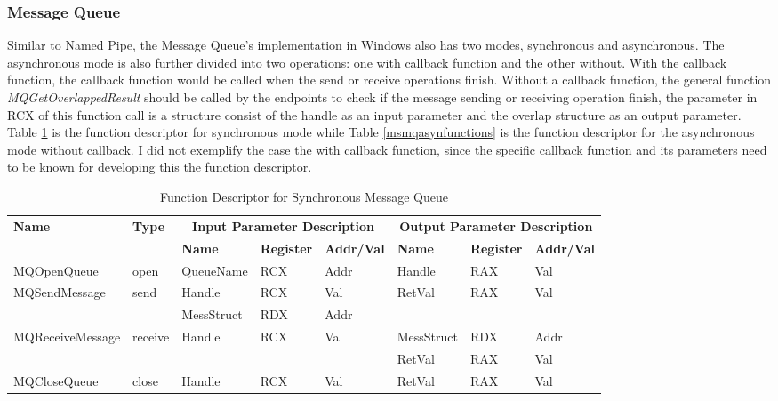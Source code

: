 \subsubsection{Message Queue}
Similar to Named Pipe, the Message Queue's implementation in Windows also has two modes, synchronous and asynchronous. The asynchronous mode is also further divided into two operations: one with callback function and the other without. With the callback function, the callback function would be called when the send or receive operations finish. Without a callback function, the general function \textit{MQGetOverlappedResult} should be called by the endpoints to check if the message sending or receiving operation finish, the parameter in RCX of this function call is a structure consist of the handle as an input parameter and the overlap structure as an output parameter. Table \ref{msmqsynfunctions} is the function descriptor for synchronous mode while Table \ref{msmqasynfunctions} is the function descriptor for the asynchronous mode without callback. I did not exemplify the case the with callback function, since the specific callback function and its parameters need to be known for developing this the function descriptor.

\begin{table}[H]
  \centering
  \caption{Function Descriptor for Synchronous Message Queue}
  \label{msmqsynfunctions}
\begin{tabular}{|l|l|l|l|l|l|l|l|}
\hline
             \multirow{2}{*}{{\textbf{Name}}} & \multirow{2}{*}{{\textbf{Type}}} & \multicolumn{3}{c|}{\textbf{Input Parameter Description}} & \multicolumn{3}{c|}{\textbf{Output Parameter Description}} \\
              \cline{3-8} 
             & & \textbf{Name}& \textbf{Register} & \textbf{Addr/Val} & \textbf{Name}& \textbf{Register} &  \textbf{Addr/Val}  \\
             \hline
      MQOpenQueue
       &open & QueueName & RCX  & Addr &  Handle & RAX & Val\\
      \hline                     
      \multirow{2}{*}{MQSendMessage}
       &\multirow{2}{*}{send} &  Handle & RCX & Val & \multirow{2}{*}{RetVal} & \multirow{2}{*}{RAX}  & \multirow{2}{*}{Val} \\
       \cline{3-5}
      & & MessStruct& RDX&Addr &   &  &  \\
      \hline            
      \multirow{2}{*}{MQReceiveMessage}
       &\multirow{2}{*}{receive}&  \multirow{2}{*}{Handle} & \multirow{2}{*}{RCX} & \multirow{2}{*}{Val}& MessStruct& RDX&Addr\\
              \cline{6-8}
      & & & & & RetVal & RAX & Val\\
      \hline       
      MQCloseQueue &
       close &  Handle & RCX & Val & RetVal & RAX & Val\\
      \hline                          
  \end{tabular}   
\end{table}

